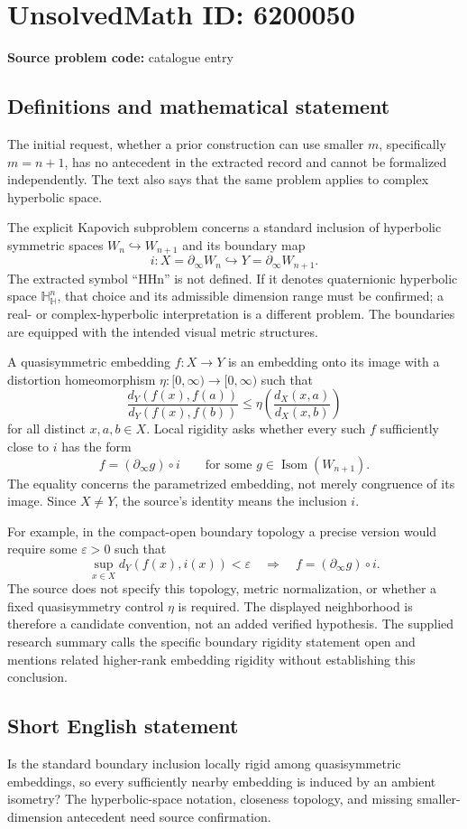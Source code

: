 \documentclass[11pt]{article}
\begin{document}
\section*{UnsolvedMath ID: 6200050}
\textbf{Source problem code:} catalogue entry
\subsection{Definitions and mathematical statement}
The initial request, whether a prior construction can use smaller \(m\), specifically \(m=n+1\), has no antecedent in the extracted record and cannot be formalized independently. The text also says that the same problem applies to complex hyperbolic space.

The explicit Kapovich subproblem concerns a standard inclusion of hyperbolic symmetric spaces \(W_n\hookrightarrow W_{n+1}\) and its boundary map
\[
i:X=\partial_\infty W_n\hookrightarrow Y=\partial_\infty W_{n+1}.
\]
The extracted symbol ``HHn'' is not defined. If it denotes quaternionic hyperbolic space \(\mathbb H_{\mathbb H}^{n}\), that choice and its admissible dimension range must be confirmed; a real- or complex-hyperbolic interpretation is a different problem. The boundaries are equipped with the intended visual metric structures.

A quasisymmetric embedding \(f:X\to Y\) is an embedding onto its image with a distortion homeomorphism \(\eta:[0,\infty)\to[0,\infty)\) such that
\[
\frac{d_Y(f(x),f(a))}{d_Y(f(x),f(b))}
\le\eta\left(\frac{d_X(x,a)}{d_X(x,b)}\right)
\]
for all distinct \(x,a,b\in X\). Local rigidity asks whether every such \(f\) sufficiently close to \(i\) has the form
\[
f=(\partial_\infty g)\circ i
\qquad\text{for some }g\in\operatorname{Isom}(W_{n+1}).
\]
The equality concerns the parametrized embedding, not merely congruence of its image. Since \(X\ne Y\), the source's identity means the inclusion \(i\).

For example, in the compact-open boundary topology a precise version would require some \(\varepsilon>0\) such that
\[
\sup_{x\in X}d_Y(f(x),i(x))<\varepsilon
\quad\Longrightarrow\quad f=(\partial_\infty g)\circ i.
\]
The source does not specify this topology, metric normalization, or whether a fixed quasisymmetry control \(\eta\) is required. The displayed neighborhood is therefore a candidate convention, not an added verified hypothesis. The supplied research summary calls the specific boundary rigidity statement open and mentions related higher-rank embedding rigidity without establishing this conclusion.
\subsection{Short English statement}
Is the standard boundary inclusion locally rigid among quasisymmetric embeddings, so every sufficiently nearby embedding is induced by an ambient isometry? The hyperbolic-space notation, closeness topology, and missing smaller-dimension antecedent need source confirmation.
\end{document}
